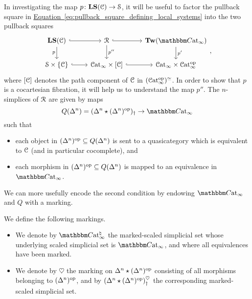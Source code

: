\documentclass[main.tex]{subfiles}
\begin{document}
In investigating the map $p\colon \mathbf{LS}(\mathcal{C}) \to \mathcal{S}$, it will be useful to factor the pullback square in \hyperref[eq:pullback_square_defining_local_systems]{Equation~\ref*{eq:pullback_square_defining_local_systems}} into the two pullback squares
\begin{equation*}
  \begin{tikzcd}
    \LS(\category{C})
    \arrow[r, hook]
    \arrow[d, swap, "p"]
    & \mathcal{R}
    \arrow[r, hook]
    \arrow[d, "p''"]
    & \Tw(\ICCat)
    \arrow[d, "p'"]
    \\
    \S \times \{\category{C}\}
    \arrow[r, hook]
    & \ICat \times [\category{C}]
    \arrow[r, hook]
    & \ICat \times \ICat\op
  \end{tikzcd},
\end{equation*}
where $[\mathcal{C}]$ denotes the path component of $\mathcal{C}$ in $( \mathcal{C}\mathrm{at}_{\infty}^{\mathrm{op}} )^{\simeq}$. In order to show that $p$ is a cocartesian fibration, it will help us to understand the map $p''$. The $n$-simplices of $\mathcal{R}$ are given by maps
\begin{equation*}
  Q(\Delta^{n}) = (\Delta^{n} \star (\Delta^{n})\op)_{\dagger} \to \ICCat
\end{equation*}
such that
\begin{itemize}
  \item each object in $(\Delta^{n})^{\mathrm{op}} \subseteq Q(\Delta^{n})$ is sent to a quasicategory which is equivalent to $\mathcal{C}$ (and in particular cocomplete), and

  \item each morphism in $(\Delta^{n})^{\mathrm{op}} \subseteq Q(\Delta^{n})$ is mapped to an equivalence in $\ICCat$.
\end{itemize}
We can more usefully encode the second condition by endowing $\ICCat$ and $Q$ with a marking.

\begin{definition}
  We define the following markings.
  \begin{itemize}
    \item We denote by $\ICCat^{\natural}$ the marked-scaled simplicial set whose underlying scaled simplicial set is $\ICCat$, and where all equivalences have been marked.

    \item We denote by $\heartsuit$ the marking on $\Delta^{n} \star (\Delta^{n})^{\mathrm{op}}$ consisting of all morphisms belonging to $(\Delta^{n})^{\mathrm{op}}$, and by $(\Delta^{n} \star (\Delta^{n})^{\mathrm{op}})^{\heartsuit}_{\dagger}$ the corresponding marked-scaled simplicial set.
  \end{itemize}
\end{definition}
\end{document}
